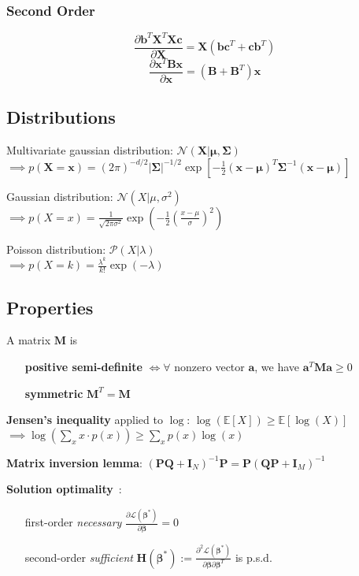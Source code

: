 \documentclass[10pt,a4paper,landscape]{article}
\renewcommand{\bf}[1]{\ensuremath{\mathbf{#1}}}
\newcommand{\bbeta}{\boldsymbol\beta}
\newcommand{\psd}{p.s.d.}
\begin{document}
\begin{multicols*}{4}
\subsubsection{Second Order}
$$\frac{\partial\bf{b}^T\bf{X}^T\bf{Xc}}{\partial\bf{X}} = \bf{X}(\bf{bc}^T+\bf{cb}^T)$$
$$\frac{\partial\bf{x}^T\bf{Bx}}{\partial\bf{x}} = (\bf{B}+\bf{B}^T)\bf{x}$$

\subsection{Distributions}
Multivariate gaussian distribution: $\mathcal{N}(\bf{X} | \bf{\mu} , \bf{\Sigma})$ \\
$\implies p(\bf{X} = \bf{x}) = (2 \pi)^{-d/2} |\bf{\Sigma|}^{-1/2} \exp{[- \frac{1}{2} (\bf{x} - \bf{\mu})^T \bf{\Sigma}^{-1} (\bf{x} - \bf{\mu})]}$

Gaussian distribution: $\mathcal{N}(X| \mu, \sigma^2)$ \\
$\implies p(X = x) = \frac{1}{\sqrt{2 \pi \sigma^2}} \exp{(- \frac{1}{2} ( \frac{x - \mu}{\sigma} )^2)}$

Poisson distribution: $\mathcal{P}(X| \lambda)$ \\
$\implies p(X = k) = \frac{\lambda ^ k}{k!} \exp{(- \lambda)}$

\subsection{Properties}

A matrix $\bf{M}$ is
\begin{itemize}
\item[\textbf{positive semi-definite}] $\iff \forall$ nonzero vector $\bf{a}$, we have $\bf{a}^T \bf{M} \bf{a} \geq 0$
\item[\textbf{symmetric}] $\bf{M}^T = \bf{M}$
\end{itemize}


\textbf{Jensen's inequality} applied to $\log$: $\log( \mathbb{E}[X] ) \geq \mathbb{E}[\log(X)]$ \\
$\implies \log ( \sum_x x \cdot p(x) ) \geq \sum_x p(x) \log(x)$

\textbf{Matrix inversion lemma}: $(\bf{PQ} + \bf{I}_N)^{-1} \bf{P} = \bf{P}(\bf{QP} + \bf{I}_M)^{-1}$


\textbf{Solution optimality}~:
\begin{itemize}
\item[first-order \textit{necessary}] $\frac{\partial\mathcal{L}(\bf{\bbeta}^*)}{\partial\bbeta} = 0$
\item[second-order \textit{sufficient}] $\bf{H}(\bf{\bbeta}^*) := \frac{\partial^2\mathcal{L}(\bbeta^*)}{\partial\bbeta\partial\bbeta^T}$ is \psd
\end{itemize}




\end{multicols*}
\end{document}
